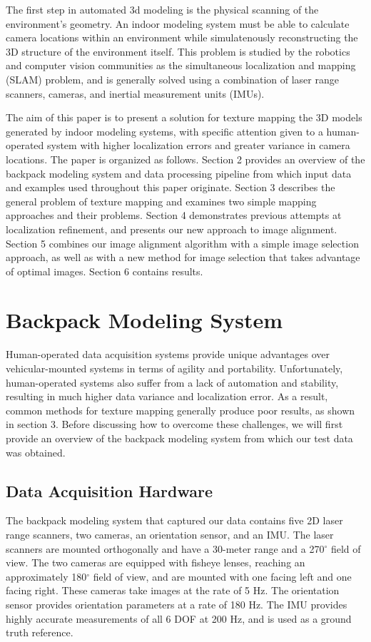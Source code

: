 \documentclass[10pt,twocolumn,letterpaper]{article}
\begin{document}
The first step in automated 3d modeling is the physical scanning of
the environment's geometry. An indoor modeling system must be able to
calculate camera locations within an environment while simulatenously
reconstructing the 3D structure of the environment itself. This
problem is studied by the robotics and computer vision communities as
the simultaneous localization and mapping (SLAM) problem, and is
generally solved using a combination of laser range scanners, cameras,
and inertial measurement units (IMUs).

The aim of this paper is to present a solution for texture mapping the
3D models generated by indoor modeling systems, with specific
attention given to a human-operated system with higher localization
errors and greater variance in camera locations. The paper is
organized as follows. Section 2 provides an overview of the backpack
modeling system and data processing pipeline from which input data and
examples used throughout this paper originate. Section 3 describes the
general problem of texture mapping and examines two simple mapping
approaches and their problems.  Section 4 demonstrates previous
attempts at localization refinement, and presents our new approach to
image alignment. Section 5 combines our image alignment algorithm with
a simple image selection approach, as well as with a new method for
image selection that takes advantage of optimal images. Section 6
contains results.

\section{Backpack Modeling System}
Human-operated data acquisition systems provide unique advantages over
vehicular-mounted systems in terms of agility and
portability. Unfortunately, human-operated systems also suffer from a
lack of automation and stability, resulting in much higher data
variance and localization error. As a result, common methods for
texture mapping generally produce poor results, as shown in section
3. Before discussing how to overcome these challenges, we will first
provide an overview of the backpack modeling system from which our
test data was obtained.

\subsection{Data Acquisition Hardware}
The backpack modeling system that captured our data contains five 2D
laser range scanners, two cameras, an orientation sensor, and an
IMU. The laser scanners are mounted orthogonally and have a 30-meter
range and a 270$^{\circ}$ field of view. The two cameras are equipped
with fisheye lenses, reaching an approximately 180$^{\circ}$ field of
view, and are mounted with one facing left and one facing right. These
cameras take images at the rate of 5 Hz. The orientation sensor
provides orientation parameters at a rate of 180 Hz. The IMU provides
highly accurate measurements of all 6 DOF at 200 Hz, and is used as a
ground truth reference.
\end{document}
